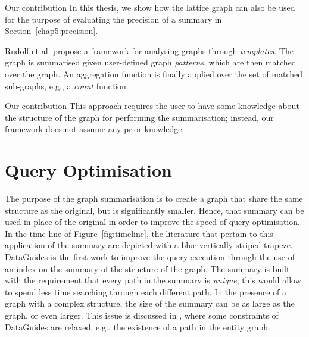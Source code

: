 \begin{centeremph}{Our contribution}
	In this thesis, we show how the \gls{lattice} graph can also be used for the purpose of evaluating the precision of a summary in Section~\ref{chap5:precision}.
\end{centeremph}

Rudolf et al. \cite{rudolf:2013:slg} propose a framework for analysing graphs through \emph{templates}. The graph is summarised given user-defined graph \emph{patterns}, which are then matched over the graph. An aggregation function is finally applied over the set of matched sub-graphs, e.g., a \emph{count} function.

\begin{centeremph}{Our contribution}
	This approach requires the user to have some knowledge about the structure of the graph for performing the summarisation; instead, our framework does not assume any prior knowledge.
\end{centeremph}

\section{Query Optimisation}
\label{chap03:review:query-optim}

The purpose of the graph summarisation is to create a graph that share the same structure as the original, but is significantly smaller. Hence, that summary can be used in place of the original in order to improve the speed of query optimisation. In the time-line of Figure~\ref{fig:timeline}, the literature that pertain to this application of the summary are depicted with a blue vertically-striped trapeze.\\

DataGuides \cite{goldman1997dataguides} is the first work to improve the query execution through the use of an index on the summary of the structure of the graph. The summary is built with the requirement that every path in the summary is \emph{unique}; this would allow to spend less time searching through each different path. In the presence of a graph with a complex structure, the size of the summary can be as large as the graph, or even larger. This issue is discussed in \cite{goldman1999approximate}, where some constraints of DataGuides are relaxed, e.g., the existence of a path in the entity graph.\\

